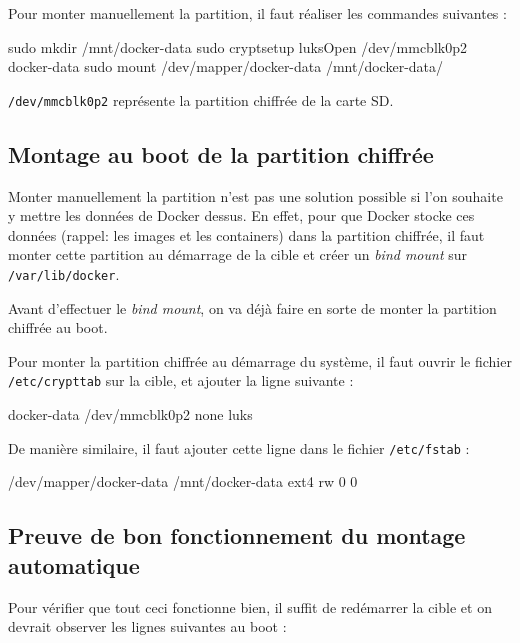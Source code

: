 \documentclass[11pt,a4paper,oneside]{report}
\newcommand{\code}[1]{\texttt{#1}}
\begin{document}
Pour monter manuellement la partition, il faut réaliser les commandes suivantes : 
\begin{bashcode}
sudo mkdir /mnt/docker-data
sudo cryptsetup luksOpen /dev/mmcblk0p2 docker-data
sudo mount /dev/mapper/docker-data /mnt/docker-data/
\end{bashcode}

\code{/dev/mmcblk0p2} représente la partition chiffrée de la carte SD.

\subsection{Montage au boot de la partition chiffrée}
Monter manuellement la partition n'est pas une solution possible si l'on souhaite y mettre les données de Docker dessus. En effet, pour que Docker stocke ces données (rappel: les images et les containers) dans la partition chiffrée, il faut monter cette partition au démarrage de la cible et créer un \textit{bind mount} sur \code{/var/lib/docker}. 


Avant d'effectuer le \textit{bind mount}, on va déjà faire en sorte de monter la partition chiffrée au boot.


Pour monter la partition chiffrée au démarrage du système, il faut ouvrir le fichier \code{/etc/crypttab} sur la cible, et ajouter la ligne suivante :
\begin{bashcode}
docker-data /dev/mmcblk0p2  none luks
\end{bashcode}

De manière similaire, il faut ajouter cette ligne dans le fichier \code{/etc/fstab} : 
\begin{bashcode}
/dev/mapper/docker-data /mnt/docker-data ext4 rw 0 0
\end{bashcode}


\subsection{Preuve de bon fonctionnement du montage automatique}
Pour vérifier que tout ceci fonctionne bien, il suffit de redémarrer la cible et on devrait observer les lignes suivantes au boot :
\end{document}

